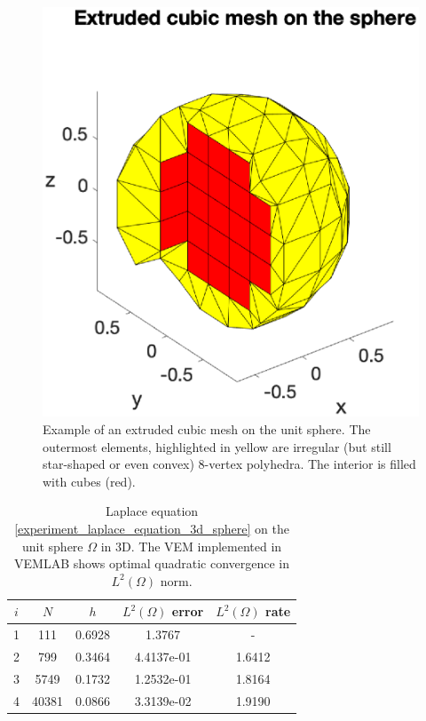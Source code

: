\documentclass[a4paper]{article}
\begin{document}
\begin{figure}[H]
\begin{center}
\includegraphics[scale=0.5]{extruded_mesh_sphere.eps}
\end{center}
\caption{Example of an extruded cubic mesh on the unit sphere.  The outermost elements, highlighted in yellow are irregular (but still star-shaped or even convex) $8$-vertex polyhedra.  The interior is filled with cubes (red).}
\label{fig:extruded_mesh_sphere}
\end{figure} 

\begin{table}[H]
\caption{Laplace equation \eqref{experiment_laplace_equation_3d_sphere} on the unit sphere $\Omega$ in 3D. The VEM implemented in VEMLAB shows optimal quadratic convergence in $L^2(\Omega)$ norm.}
\begin{center}
\begin{tabular}{c | c | c | c | c}
$i$ & $N$ & $h$ & $L^2(\Omega)$ error & $L^2(\Omega)$ rate\\
\hline
1 & 111 & 0.6928 &   1.3767 &  -   \\
2 & 799 & 0.3464 & 4.4137e-01 & 1.6412    \\
3 & 5749 & 0.1732 & 1.2532e-01 & 1.8164    \\
4 & 40381 & 0.0866 &  3.3139e-02 & 1.9190
\end{tabular}
\end{center}
\label{tab:laplace_3d_convergence_sphere}
\end{table}
\end{document}
